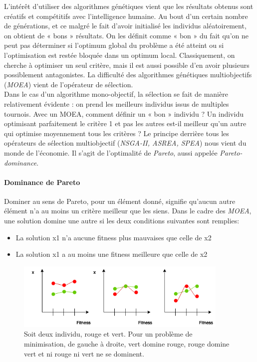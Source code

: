 \documentclass[12pt]{memoir}
\begin{document}
L'intérêt d'utiliser des algorithmes génétiques vient que les résultats
obtenus sont créatifs et compétitifs avec l'intelligence humaine. Au
bout d'un certain nombre de générations, et ce malgré le fait d'avoir
initialisé les individus aléatoirement, on obtient de « bons »
résultats. On les définit comme « bon » du fait qu'on ne peut pas
déterminer si l'optimum global du problème a été atteint ou si
l'optimisation est restée bloquée dans un optimum local. Classiquement,
on cherche à optimiser un seul critère, mais il est aussi possible d'en
avoir plusieurs possiblement antagonistes. La difficulté des algorithmes génétiques multiobjectifs (\emph{MOEA}) vient de l'opérateur de
sélection. 
\\ Dans le cas d'un algorithme mono-objectif, la sélection se
fait de manière relativement évidente : on prend les meilleurs individus
issus de multiples tournois. Avec un MOEA, comment définir un « bon »
individu ? Un individu optimisant parfaitement le critère 1 et pas les
autres est-il meilleur qu'un autre qui optimise moyennement tous les
critères ? Le principe derrière tous les opérateurs de sélection
multiobjectif (\emph{NSGA-II\cite{deb2002fast}, ASREA\cite{sharma2010archived,sharma2010gpgpu}, SPEA}) nous vient du monde de
l'économie. Il s'agit de l'optimalité de \emph{Pareto}, aussi appelée
\emph{Pareto-dominance}.

\paragraph{Dominance de Pareto}\label{dominance-de-pareto}

Dominer au sens de Pareto\cite{voorneveld2003characterization}, pour un élément donné, signifie qu'aucun
autre élément n'a au moins un critère meilleur que les siens. Dans le
cadre des \emph{MOEA}, une solution domine une autre si les deux
conditions suivantes sont remplies:

\begin{itemize}
\item
  La solution x1 n'a aucune fitness plus mauvaises que celle de x2
\item
  La solution x1 a au moins une fitness meilleure que celle de x2
\end{itemize}

\begin{figure}[htbp]
	\begin{center}
		\includegraphics[width=4in]{img/paretoDominance.png}
		\caption{Soit deux individu, rouge et vert. Pour un problème de minimisation, de gauche à droite, vert domine rouge, rouge domine vert et ni rouge ni vert ne se dominent.}
	\end{center}
\end{figure}
\end{document}
